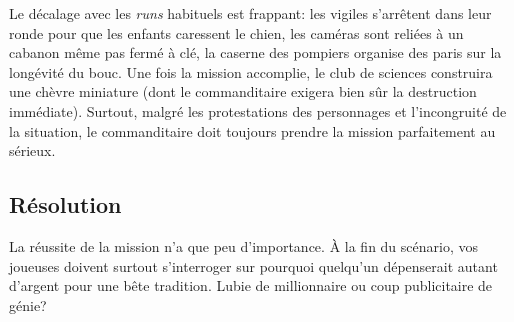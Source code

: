 Le décalage avec les \emph{runs} habituels est frappant: les vigiles s'arrêtent dans leur ronde pour que les enfants caressent le chien, les caméras sont reliées à un cabanon même pas fermé à clé, la caserne des pompiers organise des paris sur la longévité du bouc.
Une fois la mission accomplie, le club de sciences construira une chèvre miniature (dont le commanditaire exigera bien sûr la destruction immédiate).
Surtout, malgré les protestations des personnages et l'incongruité de la situation, le commanditaire doit toujours prendre la mission parfaitement au sérieux.

\subsection{Résolution}

La réussite de la mission n'a que peu d'importance.
À la fin du scénario, vos joueuses doivent surtout s'interroger sur \og pourquoi \fg quelqu'un dépenserait autant d'argent pour une bête tradition.
Lubie de millionnaire ou coup publicitaire de génie?

